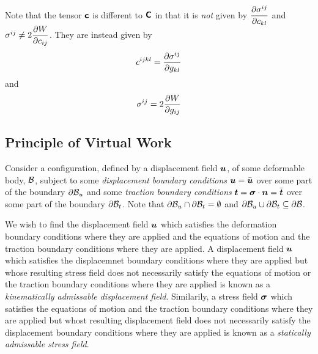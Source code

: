 Note that the tensor $\boldsymbol{\mathsf{c}}$ is different to $\boldsymbol{\mathsf{C}}$ in that
it is \emph{not} given by $ \dfrac{\partial \sigma^{ij}}{\partial c_{kl}} $ and $\sigma^{ij}\neq
2 \dfrac{\partial W}{\partial c_{ij}} $. They are instead given by
\begin{equation}
  c^{ijkl}= \dfrac{\partial \sigma^{ij}}{\partial g_{kl}} 
\end{equation}
and
\begin{equation}
  \sigma^{ij}=2 \dfrac{\partial W}{\partial g_{ij}} 
\end{equation}

\subsection{Principle of Virtual Work}

Consider a configuration, defined by a displacement field $\boldsymbol{u}$, of some
deformable body, $ \mathcal{B} $, subject to some \emph{displacement
  boundary conditions} $\boldsymbol{u}=\bar{\boldsymbol{u}}$ over some part of the
boundary $ \partial{\ensuremath{ \mathcal{B} }} _{u}$ and some \emph{traction boundary
  conditions} $\boldsymbol{t}=\boldsymbol{\mathit{\sigma}}\cdot\boldsymbol{n}=\bar{\boldsymbol{t}}$
over some part of the boundary $ \partial{\ensuremath{ \mathcal{B} }} _{t}$. Note that
$ \partial{\ensuremath{ \mathcal{B} }} _{u}\cap \partial{\ensuremath{ \mathcal{B} }} _{t}=\emptyset$
and
$ \partial{\ensuremath{ \mathcal{B} }} _{u}\cup \partial{\ensuremath{ \mathcal{B} }} _{t}\subseteq \partial{\ensuremath{ \mathcal{B} }} $.

We wish to find the displacement field $\boldsymbol{u}$ which satisfies the
deformation boundary conditions where they are applied and the equations of
motion and the traction boundary conditions where they are applied. A
displacement field $\boldsymbol{u}$ which satisfies the displacemnet boundary
conditions where they are applied but whose resulting stress field does not
necessarily satisfy the equations of motion or the traction boundary
conditions where they are applied is known as a \emph{kinematically admissable
  displacement field}. Similarily, a stress field $\boldsymbol{\mathit{\sigma}}$ which
satisfies the equations of motion and the traction boundary conditions where
they are applied but whost resulting displacement field does not necessarily
satisfy the displacement boundary conditions where they are applied is known
as a \emph{statically admissable stress field}.

